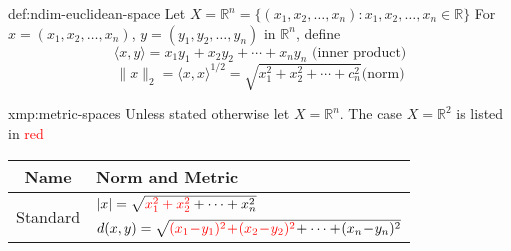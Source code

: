 \documentclass[landscape, 8pt]{extarticle}
\begin{document}
\begin{multicols}{3}
\vspace{-5pt}

\begin{dfn}{def:ndim-euclidean-space}{}
    \vspace{-5pt}
    Let $X = \mathbb{R}^{n} = \{(x_{1},x_{2},\dots,x_{n}) : x_{1},x_{2},\dots,x_{n}\in\mathbb{R}\}$
    \newline
    For $x = (x_{1},x_{2},\dots,x_{n})$, $y=(y_{1},y_{2},\dots,y_{n})$ in $\mathbb{R}^{n}$, define
    \[\langle x,y \rangle = x_{1}y_{1} + x_{2}y_{2} + \cdots + x_{n}y_{n} \text{ (inner product)}\]
    \[\lVert x \rVert_{2} = \langle x,x \rangle^{1/2} = \sqrt{x^{2}_{1} + x^{2}_{2} + \cdots + c^{2}_{n}}\text{(norm)}\]
\end{dfn}
\vspace{-5pt}

\begin{xmp}{xmp:metric-spaces}{}
    \vspace{-5pt}
    Unless stated otherwise let $X = \mathbb{R}^{n}$. The case $X = \mathbb{R}^{2}$ is listed in \textcolor{red}{red}

    \def\arraystretch{1.5}
    \begin{center}
        \begin{tabular}{|c|l|}
        \hline
        Name & Norm and Metric \\
        \hline
        \multirow{2}{*}{Standard} & $\lvert x \rvert = \sqrt{\textcolor{red}{x^{2}_{1} + x^{2}_{2}} + \cdots + x^{2}_{n}}$ \\
        & $d(x, y) = \sqrt{\textcolor{red}{(x_{1} \! - \! y_{1})^{2} \! + \! (x_{2} \! - \! y_{2})^{2}} \! + \cdots + \! (x_{n} \! - \! y_{n})^{2}}$ \\


\end{tabular}
\end{center}
\end{xmp}
\end{multicols}
\end{document}
